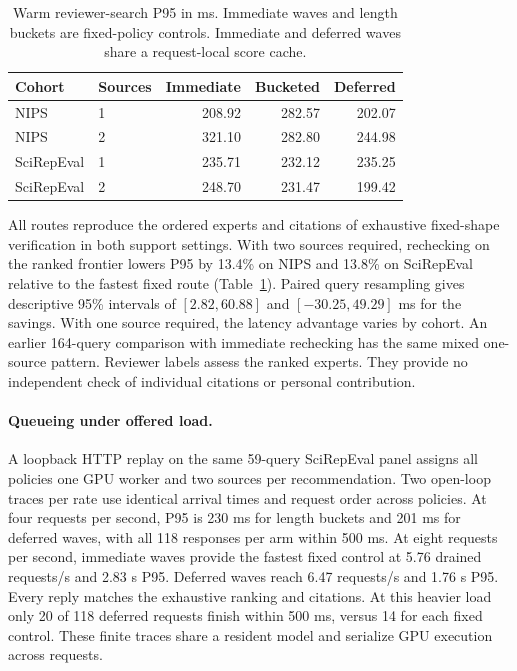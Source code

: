 \begin{table}[t]
\caption{Warm reviewer-search P95 in ms. Immediate waves and length buckets are fixed-policy controls. Immediate and deferred waves share a request-local score cache.}
\label{tab:live}
\centering\small
\begin{tabular}{@{}llrrr@{}}\toprule
Cohort & Sources & Immediate & Bucketed & Deferred \\\midrule
NIPS & 1 & 208.92 & 282.57 & 202.07 \\
NIPS & 2 & 321.10 & 282.80 & 244.98 \\
SciRepEval & 1 & 235.71 & 232.12 & 235.25 \\
SciRepEval & 2 & 248.70 & 231.47 & 199.42 \\\bottomrule
\end{tabular}
\end{table}

All routes reproduce the ordered experts and citations of exhaustive fixed-shape verification in both support settings. With two sources required, rechecking on the ranked frontier lowers P95 by 13.4\% on NIPS and 13.8\% on SciRepEval relative to the fastest fixed route (Table~\ref{tab:live}). Paired query resampling gives descriptive 95\% intervals of $[2.82,60.88]$ and $[-30.25,49.29]$ ms for the savings. With one source required, the latency advantage varies by cohort. An earlier 164-query comparison with immediate rechecking has the same mixed one-source pattern. Reviewer labels assess the ranked experts. They provide no independent check of individual citations or personal contribution.

\paragraph{Queueing under offered load.}
A loopback HTTP replay on the same 59-query SciRepEval panel assigns all policies one GPU worker and two sources per recommendation. Two open-loop traces per rate use identical arrival times and request order across policies. At four requests per second, P95 is 230 ms for length buckets and 201 ms for deferred waves, with all 118 responses per arm within 500 ms. At eight requests per second, immediate waves provide the fastest fixed control at 5.76 drained requests/s and 2.83 s P95. Deferred waves reach 6.47 requests/s and 1.76 s P95. Every reply matches the exhaustive ranking and citations. At this heavier load only 20 of 118 deferred requests finish within 500 ms, versus 14 for each fixed control. These finite traces share a resident model and serialize GPU execution across requests.

